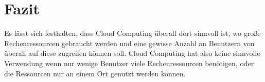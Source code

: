 \section{Fazit}
Es lässt sich festhalten, dass Cloud Computing überall dort sinnvoll ist, wo große Rechenressourcen gebraucht werden und eine gewisse Anzahl an Benutzern von überall auf diese zugreifen können soll. Cloud Computing hat also keine sinnvolle Verwendung wenn nur wenige Benutzer viele Rechenressourcen benötigen, oder die Ressourcen nur an einem Ort genutzt werden  können.

